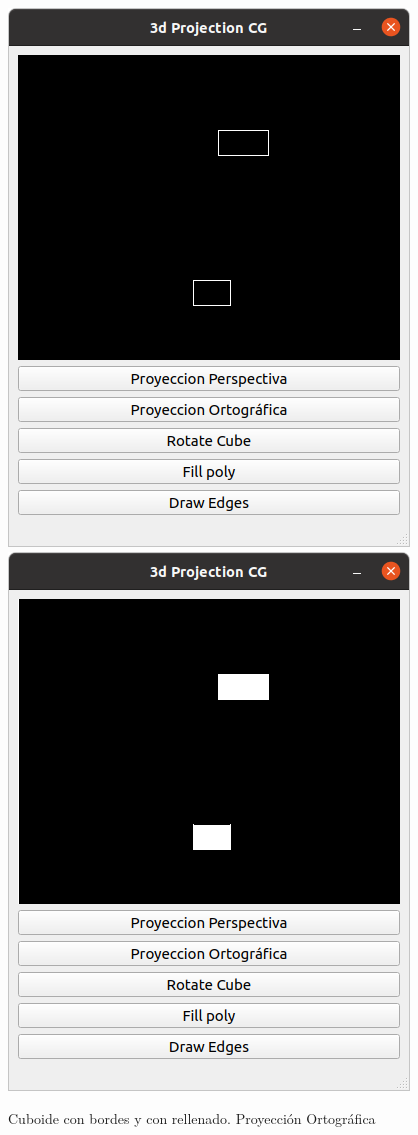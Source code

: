 \documentclass[12pt]{article}
\begin{document}
\begin{figure}[H]
\centering
\includegraphics[scale=0.5]{images/ej1_ort.png}
\includegraphics[scale=0.5]{images/ej2_ort.png}
\caption{Cuboide con bordes y con rellenado. Proyección Ortográfica}
\end{figure}
\end{document}
